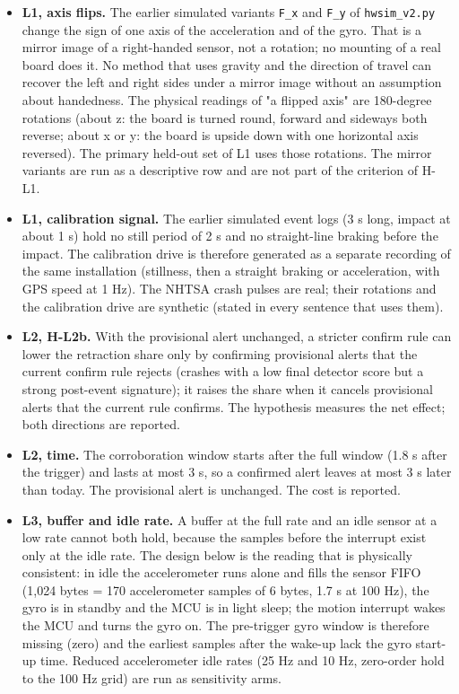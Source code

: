 \begin{itemize}
\item \textbf{L1, axis flips.} The earlier simulated variants \texttt{F\_x} and \texttt{F\_y} of \texttt{hwsim\_v2.py} change the sign of one axis of the acceleration and of the gyro. That is a mirror image of a right-handed sensor, not a rotation; no mounting of a real board does it. No method that uses gravity and the direction of travel can recover the left and right sides under a mirror image without an assumption about handedness. The physical readings of "a flipped axis" are 180-degree rotations (about z: the board is turned round, forward and sideways both reverse; about x or y: the board is upside down with one horizontal axis reversed). The primary held-out set of L1 uses those rotations. The mirror variants are run as a descriptive row and are not part of the criterion of H-L1.
\item \textbf{L1, calibration signal.} The earlier simulated event logs (3 s long, impact at about 1 s) hold no still period of 2 s and no straight-line braking before the impact. The calibration drive is therefore generated as a separate recording of the same installation (stillness, then a straight braking or acceleration, with GPS speed at 1 Hz). The NHTSA crash pulses are real; their rotations and the calibration drive are synthetic (stated in every sentence that uses them).
\item \textbf{L2, H-L2b.} With the provisional alert unchanged, a stricter confirm rule can lower the retraction share only by confirming provisional alerts that the current confirm rule rejects (crashes with a low final detector score but a strong post-event signature); it raises the share when it cancels provisional alerts that the current rule confirms. The hypothesis measures the net effect; both directions are reported.
\item \textbf{L2, time.} The corroboration window starts after the full window (1.8 s after the trigger) and lasts at most 3 s, so a confirmed alert leaves at most 3 s later than today. The provisional alert is unchanged. The cost is reported.
\item \textbf{L3, buffer and idle rate.} A buffer at the full rate and an idle sensor at a low rate cannot both hold, because the samples before the interrupt exist only at the idle rate. The design below is the reading that is physically consistent: in idle the accelerometer runs alone and fills the sensor FIFO (1,024 bytes = 170 accelerometer samples of 6 bytes, 1.7 s at 100 Hz), the gyro is in standby and the MCU is in light sleep; the motion interrupt wakes the MCU and turns the gyro on. The pre-trigger gyro window is therefore missing (zero) and the earliest samples after the wake-up lack the gyro start-up time. Reduced accelerometer idle rates (25 Hz and 10 Hz, zero-order hold to the 100 Hz grid) are run as sensitivity arms.

\end{itemize}
